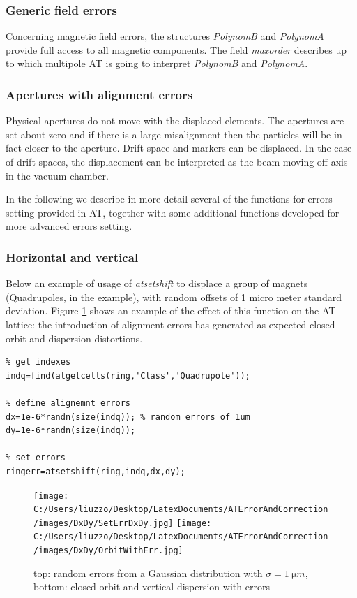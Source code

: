 \subsubsection*{Generic field errors}
Concerning magnetic field errors, the structures \emph{PolynomB} and \emph{PolynomA} provide full access to all magnetic components. The field \emph{maxorder} describes up to which multipole AT is going to interpret \emph{PolynomB} and \emph{PolynomA}.

\subsubsection*{Apertures with alignment errors}
Physical apertures do not move with the displaced elements. The apertures are set about zero and if there is a large misalignment then the particles will be in fact closer to the aperture. Drift space and markers can be displaced. In the case of drift spaces, the displacement can be interpreted as the beam moving off axis in the vacuum chamber.

\clearpage
In the following we describe in more detail several of the functions for errors setting provided in AT, together with some additional functions developed for more advanced errors setting.

\subsubsection*{Horizontal and vertical}
Below an example of usage of \emph{atsetshift} to displace a group of magnets (Quadrupoles, in the example), with random offsets of 1 micro meter standard deviation.
Figure \ref{fig:dxdy} shows an example of the effect of this function on the AT lattice: the introduction of alignment errors has generated as expected closed orbit and dispersion distortions.

\begin{lstlisting}
% get indexes
indq=find(atgetcells(ring,'Class','Quadrupole'));

% define alignemnt errors
dx=1e-6*randn(size(indq)); % random errors of 1um
dy=1e-6*randn(size(indq));

% set errors
ringerr=atsetshift(ring,indq,dx,dy);
\end{lstlisting}

\begin{figure}[!h]
	\centering
		\texttt{[image: C:/Users/liuzzo/Desktop/LatexDocuments/ATErrorAndCorrection/images/DxDy/SetErrDxDy.jpg]}
	\texttt{[image: C:/Users/liuzzo/Desktop/LatexDocuments/ATErrorAndCorrection/images/DxDy/OrbitWithErr.jpg]}
	\caption{top: random errors from a Gaussian distribution with $\sigma=\SI{1}{\micro m}$,\\ bottom: closed orbit and vertical dispersion with errors}
	\label{fig:dxdy}
\end{figure}

